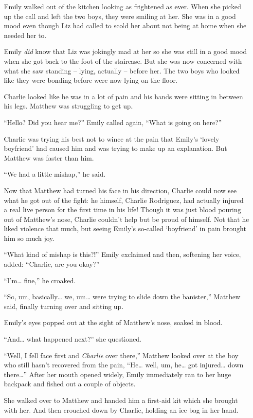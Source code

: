 Emily walked out of the kitchen looking as frightened as ever. When she picked up the call and left the two boys, they were smiling at her. She was in a good mood even though Liz had called to scold her about not being at home when she needed her to.

Emily \textit{did} know that Liz was jokingly mad at her so she was still in a good mood when she got back to the foot of the staircase. But she was now concerned with what she saw standing – lying, actually – before her. The two boys who looked like they were bonding before were now lying on the floor.

Charlie looked like he was in a lot of pain and his hands were sitting in between his legs. Matthew was struggling to get up.

“Hello? Did you hear me?” Emily called again, “What is going on here?”

Charlie was trying his best not to wince at the pain that Emily's ‘lovely boyfriend' had caused him and was trying to make up an explanation. But Matthew was faster than him.

“We had a little mishap,” he said.

Now that Matthew had turned his face in his direction, Charlie could now see what he got out of the fight: he himself, Charlie Rodriguez, had actually injured a real live person for the first time in his life! Though it was just blood pouring out of Matthew's nose, Charlie couldn't help but be proud of himself. Not that he liked violence that much, but seeing Emily's so-called ‘boyfriend' in pain brought him so much joy.

“What kind of mishap is this?!” Emily exclaimed and then, softening her voice, added: “Charlie, are you okay?”

“I'm… fine,” he croaked.

“So, um, basically… we, um… were trying to slide down the banister,” Matthew said, finally turning over and sitting up.

Emily's eyes popped out at the sight of Matthew's nose, soaked in blood.

“And… what happened next?” she questioned.

“Well, I fell face first and \textit{Charlie} over there,” Matthew looked over at the boy who still hasn't recovered from the pain, “He… well, um, he… got injured… down there…”
After her mouth opened widely, Emily immediately ran to her huge backpack and fished out a couple of objects.

She walked over to Matthew and handed him a first-aid kit which she brought with her. And then crouched down by Charlie, holding an ice bag in her hand.

